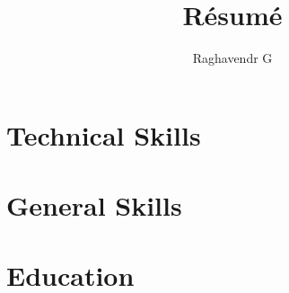 \documentclass{article}
\title{R\'esum\'e}
\author{Raghavendr G}
\begin{document}
\maketitle

\section{Technical Skills}
\section{General Skills}
\section{Education}
\end{document}

